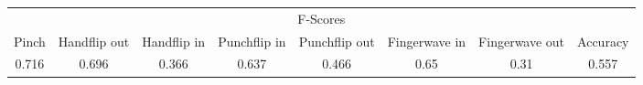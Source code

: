 \documentclass{standalone}
\begin{document}
 
 \begin{tabular}{|c|c|c|c|c|c|c ||c|}
\cline{1-8}\multicolumn{8}{|c|}{F-Scores} \\ 
\cline{1-8}Pinch & Handflip out & Handflip in & Punchflip in & Punchflip out & Fingerwave in & Fingerwave out & Accuracy\\ 
\cline{1-8}0.716 & 0.696 & 0.366 & 0.637 & 0.466 & 0.65 & 0.31 & 0.557\\ 
 \cline{1-8}\hline \end{tabular}
 
\end{document}
